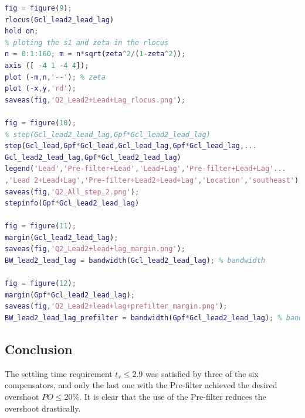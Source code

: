 \documentclass[11pt, a4paper]{article}
\begin{document}
\begin{lstlisting}[language=matlab, caption={}, label={}]
%% Comparing the new compensator of the previous designs.
fig = figure(9);
rlocus(Gcl_lead2_lead_lag)
hold on;
% ploting the s1 and zeta in the rlocus
n = 0:1:160; m = n*sqrt(zeta^2/(1-zeta^2));
axis ([ -4 1 -4 4]);
plot (-m,n,'--'); % zeta
plot (-x,y,'rd');
saveas(fig,'Q2_Lead2+Lead+Lag_rlocus.png');

fig = figure(10);
% step(Gcl_lead2_lead_lag,Gpf*Gcl_lead2_lead_lag)
step(Gcl_lead,Gpf*Gcl_lead,Gcl_lead_lag,Gpf*Gcl_lead_lag,...
Gcl_lead2_lead_lag,Gpf*Gcl_lead2_lead_lag)
legend('Lead','Pre-filter+Lead','Lead+Lag','Pre-filter+Lead+Lag'...
,'Lead 2+Lead+Lag','Pre-filter+Lead2+Lead+Lag','Location','southeast');
saveas(fig,'Q2_All_step_2.png');
stepinfo(Gpf*Gcl_lead2_lead_lag)

fig = figure(11);
margin(Gcl_lead2_lead_lag);
saveas(fig,'Q2_Lead2+lead+lag_margin.png');
BW_lead2_lead_lag = bandwidth(Gcl_lead2_lead_lag); % bandwidth

fig = figure(12);
margin(Gpf*Gcl_lead2_lead_lag);
saveas(fig,'Q2_Lead2+lead+lag+prefilter_margin.png');
BW_lead2_lead_lag_prefilter = bandwidth(Gpf*Gcl_lead2_lead_lag); % bandwidth
\end{lstlisting}


\subsection{Conclusion}
The settling time requirement $t_s\leq2.9$ was satisfied by three of the six compensators, and only the last one with the Pre-filter achieved the desired overshoot $PO\leq 20 \%$. It is clear that the use of the Pre-filter reduces the overshoot drastically.  








\printbibliography
\end{document}
